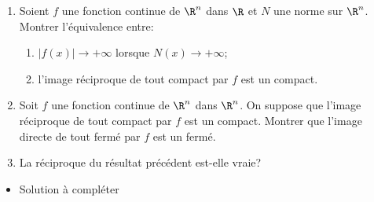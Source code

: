 \begin{enonce}
\begin{exercise}[ID={RMS134 E672},subtitle={Mines-Ponts MP 2023},theme={analyse},annee={2023},concours={mines-ponts},filiere={MP}]
  \begin{enumerate}
  \item Soient $f$ une fonction continue de $\R^n$ dans $\R$ et $N$
    une norme sur $\R^n$. Montrer l'équivalence entre:
    \begin{enumerate}
    \item $|f(x)|\to +\infty$ lorsque $N(x)\to +\infty$;
    \item l'image réciproque de tout compact par $f$ est un compact.
    \end{enumerate}
  \item Soit $f$ une fonction continue de $\R^n$ dans $\R^n$. On
    suppose que l'image réciproque de tout compact par $f$ est un
    compact. Montrer que l'image directe de tout fermé par $f$ est un
    fermé.
  \item La réciproque du résultat précédent est-elle vraie?
  \end{enumerate}
\end{exercise}
\begin{solution}
  \begin{itemize}
    \item Solution à compléter
  \end{itemize}
\end{solution}
\end{enonce}